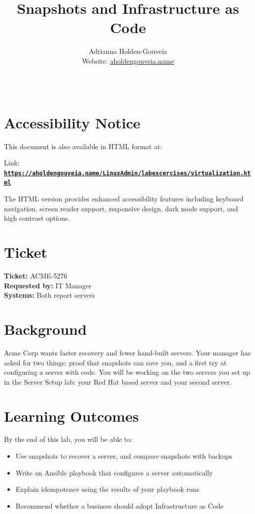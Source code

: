 \documentclass[12pt]{article}
\title{Snapshots and Infrastructure as Code}
\author{
        Adrianna Holden-Gouveia \\
        Website: \href{https://aholdengouveia.name}{aholdengouveia.name}\\ 
        \date{\vspace{-5ex}}
        \faGithub {: aholdengouveia} \\
        }
\begin{document}
    

\maketitle



\section*{Accessibility Notice}
This document is also available in HTML format at:

Link: \href{https://aholdengouveia.name/LinuxAdmin/labexcercises/virtualization.html}{\textbf{\nolinkurl{https://aholdengouveia.name/LinuxAdmin/labexcercises/virtualization.html}}}

The HTML version provides enhanced accessibility features including keyboard navigation, screen reader support, responsive design, dark mode support, and high contrast options.


\section*{Ticket}
\noindent\textbf{Ticket:} ACME-5276\\
\textbf{Requested by:} IT Manager\\
\textbf{Systems:} Both report servers

\section*{Background}
Acme Corp wants faster recovery and fewer hand-built servers. Your manager has asked for two things: proof that snapshots can save you, and a first try at configuring a server with code. You will be working on the two servers you set up in the Server Setup lab: your Red Hat based server and your second server.

\section*{Learning Outcomes}
By the end of this lab, you will be able to:
\begin{itemize}
    \item Use snapshots to recover a server, and compare snapshots with backups
    \item Write an Ansible playbook that configures a server automatically
    \item Explain idempotence using the results of your playbook runs
    \item Recommend whether a business should adopt Infrastructure as Code
\end{itemize}
\end{document}
